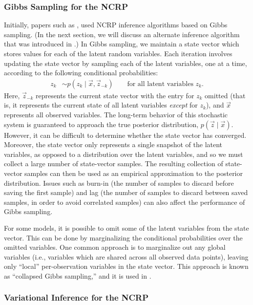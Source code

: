 \documentclass{article}
\begin{document}
\subsubsection{Gibbs Sampling for the NCRP}

Initially, papers such as \cite{griffiths2004hierarchical}, used NCRP inference algorithms based on Gibbs sampling.
(In the next section, we will discuss an alternate inference algorithm that was introduced in \cite{wang2009vi_ncrp}.)
In Gibbs sampling, we maintain a state vector which stores values for each of the latent random variables.
Each iteration involves updating the state vector by sampling each of the latent variables, one at a time, according to the following conditional probabilities:
\begin{align*}
z_k &\sim p(z_k \mid \vec x, \vec z_{-k}) \qquad \text{for all latent variables $z_k$.}
\end{align*}
Here, $\vec z_{-k}$ represents the current state vector with the entry for $z_k$ omitted (that is, it represents the current state of all latent variables \emph{except} for $z_k$), and $\vec x$ represents all observed variables.
The long-term behavior of this stochastic system is guaranteed to approach the true posterior distribution, $p(\vec z \mid \vec x)$.
However, it can be difficult to determine whether the state vector has converged.
Moreover, the state vector only represents a single snapshot of the latent variables, as opposed to a distribution over the latent variables, and so we must collect a large number of state-vector samples.
The resulting collection of state-vector samples can then be used as an empirical approximation to the posterior distribution.
Issues such as burn-in (the number of samples to discard before saving the first sample) and lag (the number of samples to discard between saved samples, in order to avoid correlated samples) can also affect the performance of Gibbs sampling.

For some models, it is possible to omit some of the latent variables from the state vector.
This can be done by marginalizing the conditional probabilities over the omitted variables.
One common approach is to marginalize out any global variables (i.e., variables which are shared across all observed data points), leaving only ``local'' per-observation variables in the state vector.
This approach is known as ``collapsed Gibbs sampling,'' and it is used in \cite{blei2010ncrp}.


\subsubsection{Variational Inference for the NCRP}
\end{document}
